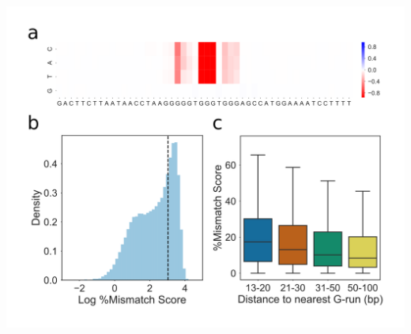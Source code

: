 \documentclass[12pt,a4paper,]{report}
\let\origfigure=\figure
\let\endorigfigure=\endfigure
\renewenvironment{figure}[1][2] {
    \expandafter\origfigure\expandafter[H]
} {
    \endorigfigure
}
\begin{document}
\begin{figure}[htbp]
\centering
\includegraphics[width=\textwidth,height=562pt,keepaspectratio]{chapter_3/figures/g_triplex.png}
\caption[Identification of G-triplex structures by G4Seeqer Mutation Maps]{\textbf{Identification   of   G-triplex   structures   by   G4Seeqer   Mutation   Maps}   \textbf{a)}   Mutation   map   showing   the   a   high   scoring   (0.99)   G4Seeqer   motif   which   may   form   a   G-triplex.   Mutation   of   any   base   in   the   central   G-run   of   the   motif   is   sufficient   to   reduce   the   score   by   up   to   80\%.   \textbf{b)}   Histogram   of   log   percentage   mismatch   score   for   motifs   conforming   to   a   G-triplex   like   pattern.   The   bimodal   distribution   suggests   that   many   of   these   motifs   form   structures   which   disrupt   polymerase   in   the   presence   of   potassium.   \textbf{c)}   Boxplot   showing   the   relationship   between   \%mm   score   and   distance   to   next   G-run   in   G-triplex   structures.   The   negative   correlation   suggests   G-triplexes   might   recruit   distant   G-runs   to   form   G4s.   \label{triplex}}
\end{figure}
\end{document}
